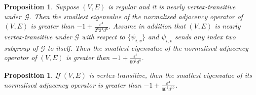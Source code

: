 \documentclass[10pt]{article}
\newtheorem{proposition}[theorem]{Proposition}
\theoremstyle{definition}
\newcommand{\calG}{\ensuremath{\mathcal{G}}}
\begin{document}
\begin{proposition}
\label{Cor:AlmostGraphAut}
Suppose $(V, E)$ is regular and it is nearly vertex-transitive under~$\calG$. Then the smallest eigenvalue of the normalised adjacency operator of $(V, E)$ is greater than $-1+ \frac {\varepsilon^4}{2^{8}3^{4}d^6}$. 
Assume in addition that $(V, E)$ is nearly vertex-transitive under $\calG$ with respect to $\{\psi_{i,v}\}$ and $\psi_{i, v}$ sends any index two subgroup of $\calG$ to itself. Then the smallest eigenvalue of the normalised adjacency operator of $(V, E)$ is greater than $ -1+\frac {\varepsilon^4}{60^2 d^6}$. 
\end{proposition}

\begin{proposition}
\label{Cor:SpannSubgraVertexTra}
If $(V, E)$ is vertex-transitive, then the smallest eigenvalue of its normalised adjacency operator is greater than $ -1+\frac {\varepsilon^4}{60^2 d^{10}}$. 
\end{proposition}
\end{document}
